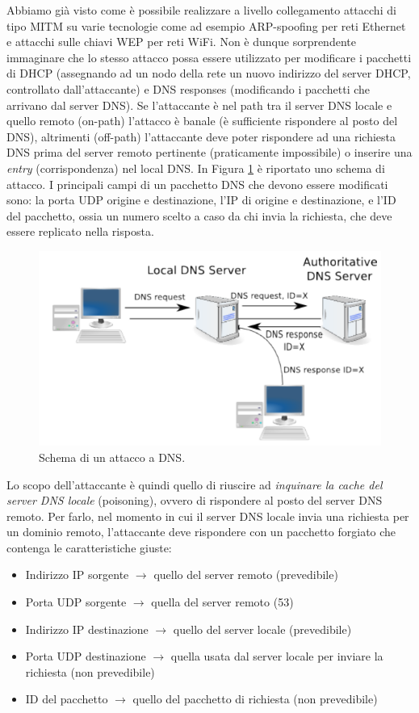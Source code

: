 Abbiamo già visto come è possibile realizzare a livello collegamento attacchi di tipo MITM su varie tecnologie come ad esempio ARP-spoofing per reti Ethernet e attacchi sulle chiavi WEP per reti WiFi. Non è dunque sorprendente  immaginare che lo stesso attacco possa essere utilizzato per modificare i pacchetti di DHCP (assegnando ad un nodo della rete un nuovo indirizzo del server DHCP, controllato dall'attaccante) e DNS responses (modificando i pacchetti che arrivano dal server DNS). Se l'attaccante è nel path tra il server DNS locale e quello remoto (on-path) l'attacco è banale (è sufficiente rispondere al posto del DNS), altrimenti (off-path) l'attaccante deve poter rispondere ad una richiesta DNS prima del server remoto pertinente (praticamente impossibile) o inserire una \textit{entry} (corrispondenza) nel local DNS. In Figura \ref{img:DNS-attack} è riportato uno schema di attacco. I principali campi di un pacchetto DNS che devono essere modificati sono: la porta UDP origine e destinazione, l'IP di origine e destinazione, e l'ID del pacchetto, ossia un numero scelto a caso da chi invia la richiesta, che deve essere replicato nella risposta.
\begin{figure}[htbp]
	\centering
	\includegraphics[scale = 0.5]{images/DNS-attack}
	\caption{Schema di un attacco a DNS.}
	\label{img:DNS-attack}
\end{figure}
\noindent
Lo scopo dell'attaccante è quindi quello di riuscire ad \textit{inquinare la cache del server DNS locale} (poisoning), ovvero di rispondere al posto del server DNS remoto. Per farlo, nel momento in cui il server DNS locale invia una richiesta per un dominio remoto, l'attaccante deve rispondere con un pacchetto forgiato che contenga le caratteristiche giuste:
\begin{itemize}
	\item Indirizzo IP sorgente $\longrightarrow$ quello del server remoto (prevedibile)
	\item Porta UDP sorgente $\longrightarrow$ quella del server remoto (53)
	\item Indirizzo IP destinazione $\longrightarrow$ quello del server locale (prevedibile)
	\item Porta UDP destinazione $\longrightarrow$ quella usata dal server locale per inviare la richiesta (non prevedibile)
	\item ID del pacchetto $\longrightarrow$ quello del pacchetto di richiesta (non prevedibile)
\end{itemize}
